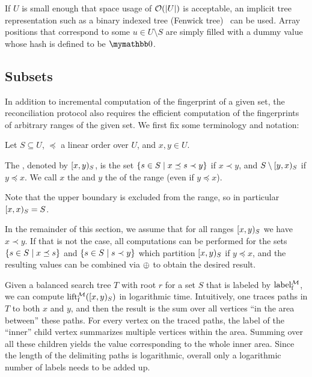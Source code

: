 If $U$ is small enough that space usage of $\mathcal{O}(|{U}|)$ is acceptable, an implicit tree representation such as a binary indexed tree (Fenwick tree)~\cite{fenwick1994new} can be used. Array positions that correspond to some $u \in U \setminus S$ are simply filled with a dummy value whose hash is defined to be $\neutraladd$.

\subsection{Subsets}
\label{subsets-associative}

In addition to incremental computation of the fingerprint of a given set, the reconciliation protocol also requires the efficient computation of the fingerprints of arbitrary ranges of the given set. We first fix some terminology and notation:

\begin{definition}
\label{def-range}
Let $S \subseteq U$, $\preceq$ a linear order over $U$, and $x, y \in U$.

The , denoted by $[{x},{y})_{S}$, is the set $\{s \in S \mid x \preceq s \prec y\}$ if $x \prec y$, and $S \setminus [{y},{x})_{S}$ if $y \preceq x$. We call $x$ the  and $y$ the  of the range (even if $y \preceq x$).

Note that the upper boundary is excluded from the range, so in particular $[{x},{x})_{S} = S$.
\end{definition}

In the remainder of this section, we assume that for all ranges $[{x},{y})_{S}$ we have $x \prec y$. If that is not the case, all computations can be performed for the sets $\{s \in S \mid x \preceq s\}$ and $\{s \in S \mid s \prec y\}$ which partition $[{x},{y})_{S}$ if $y \preceq x$, and the resulting values can be combined via $\oplus$ to obtain the desired result.

Given a balanced search tree $T$ with root $r$ for a set $S$ that is labeled by $\operatorname{label_{\operatorname{f}}^{\mathcal{M}}}$, we can compute $\operatorname{lift_{\operatorname{f}}^{\mathcal{M}}}([{x},{y})_{S})$ in logarithmic time. Intuitively, one traces paths in $T$ to both $x$ and $y$, and then the result is the sum over all vertices ``in the area between'' these paths. For every vertex on the traced paths, the label of the ``inner'' child vertex summarizes multiple vertices within the area. Summing over all these children yields the value corresponding to the whole inner area. Since the length of the delimiting paths is logarithmic, overall only a logarithmic number of labels needs to be added up.

